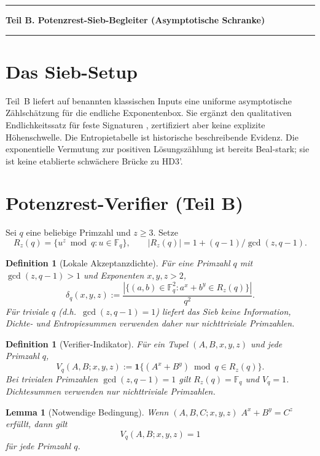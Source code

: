 \documentclass[11pt,a4paper]{article}
\newtheorem{lemma}[theorem]{Lemma}
\newtheorem{definition}[theorem]{Definition}
\begin{document}
\bigskip\hrule\medskip
\begin{center}
\textbf{Teil B. Potenzrest-Sieb-Begleiter (Asymptotische Schranke)}
\end{center}
\medskip\hrule\bigskip

\section{Das Sieb-Setup}
\label{sec:weilinput}

Teil~B liefert auf benannten klassischen Inputs eine uniforme
asymptotische Zählschätzung für die endliche Exponentenbox.
Sie ergänzt den qualitativen Endlichkeitssatz für feste Signaturen
\cite{DarmonGranville1995}, zertifiziert aber keine explizite
Höhenschwelle. Die Entropietabelle ist historische beschreibende
Evidenz. Die exponentielle Vermutung zur positiven Lösungszählung
ist bereits Beal-stark; sie ist keine etablierte schwächere Brücke
zu HD3'.

\section{Potenzrest-Verifier (Teil B)}

Sei $q$ eine beliebige Primzahl und $z \ge 3$. Setze
\[
  R_z(q) = \{u^z \bmod q : u \in \mathbb{F}_q\},
  \qquad
  |R_z(q)| = 1 + (q-1)/\gcd(z,q-1).
\]

\begin{definition}[Lokale Akzeptanzdichte]
\label{def:delta}
Für eine Primzahl $q$ mit $\gcd(z,q-1)>1$ und Exponenten $x,y,z>2$,
\[
  \delta_q(x,y,z) :=
    \frac{|\{(a,b)\in \mathbb{F}_q^2 : a^x+b^y \in R_z(q)\}|}{q^2}.
\]
Für triviale $q$ (d.h.\ $\gcd(z,q-1)=1$) liefert das Sieb keine Information, Dichte- und Entropiesummen verwenden daher nur nichttriviale Primzahlen.
\end{definition}

\begin{definition}[Verifier-Indikator]
\label{def:Vq}
Für ein Tupel $(A,B,x,y,z)$ und jede Primzahl $q$,
\[
  V_q(A,B;x,y,z) :=
    \mathbf{1}\bigl\{(A^x+B^y) \bmod q \in R_z(q)\bigr\}.
\]
Bei trivialen Primzahlen $\gcd(z,q-1)=1$ gilt
$R_z(q)=\mathbb F_q$ und $V_q=1$. Dichtesummen verwenden nur
nichttriviale Primzahlen.
\end{definition}

\begin{lemma}[Notwendige Bedingung]
\label{lem:necessary}
Wenn $(A,B,C;x,y,z)$ $A^x+B^y=C^z$ erfüllt, dann gilt
\[
  V_q(A,B;x,y,z)=1
\]
für jede Primzahl $q$.
\end{lemma}
\end{document}
